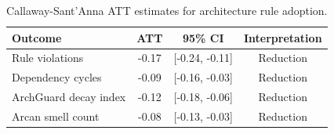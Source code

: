 \begin{table}[t]
\centering
\caption{Callaway-Sant'Anna ATT estimates for architecture rule adoption.}
\label{tab:did_att}
\setlength{\aboverulesep}{0pt}
\setlength{\belowrulesep}{0pt}
\renewcommand{\arraystretch}{1.25}
\begin{tabular}{lccc}
\toprule
\textbf{Outcome} & \textbf{ATT} & \textbf{95\% CI} & \textbf{Interpretation} \\
\midrule
\rowcolor{rowband}
Rule violations & -0.17 & [-0.24, -0.11] & Reduction \\
Dependency cycles & -0.09 & [-0.16, -0.03] & Reduction \\
\rowcolor{rowband}
ArchGuard decay index & -0.12 & [-0.18, -0.06] & Reduction \\
Arcan smell count & -0.08 & [-0.13, -0.03] & Reduction \\
\bottomrule
\end{tabular}
\end{table}
